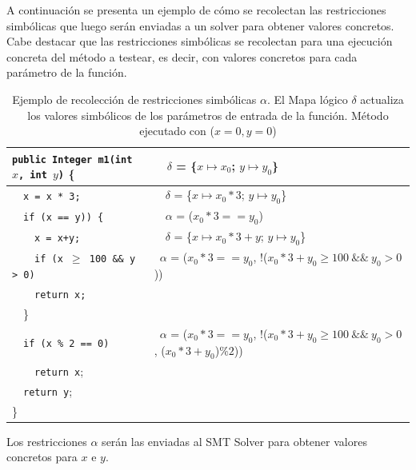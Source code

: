 \documentclass{llncs}
\begin{document}
\begin{itemize}
  A continuación se presenta un ejemplo de cómo se recolectan las restricciones simbólicas que luego serán enviadas a un solver para obtener valores concretos.
  Cabe destacar que las restricciones simbólicas se recolectan para una ejecución concreta del método a testear, es decir, con valores concretos para cada parámetro de la función.
  
      \begin{table}
	\centering
	\begin{tabular}{|m{5.5cm} | m{6cm}|}
	  \hline
	  \texttt{public Integer m1(int $x$, int $y$)} \{  & \ \ $\delta$ = \{$x \mapsto x_0$; $y \mapsto y_0$\}\\
	  \hline
	  \ \ \texttt{x = x * 3;}                          & \ \ $\delta$ = \{$x \mapsto x_0*3$; $y \mapsto y_0$\}\\
	  \hline
	  \ \ \texttt{if (x == y)) \{} 	                   & \ \ $\alpha$ = ($x_0*3 == y_0$)\\
	  \hline
	  \ \ \ \ \texttt{x = x+y;} 		           & \ \ $\delta$ = \{$x \mapsto x_0*3+y$; $y \mapsto y_0$\}\\
	  \hline
	  \ \ \ \ \texttt{if (x $\geq$ 100\ \&\&\ y > 0)}  & \ $\alpha$ = ($x_0*3 == y_0$, !($x_0*3+y_0 \geq 100\ \&\&\ y_0>0$))\\
	  \hline
	  \ \ \ \ \texttt{return x;} 			   & \\
	  \hline
	  \ \ \} 				  	   & \\
	  \hline
	  \ \ \texttt{if (x \% 2 == 0)}			   & \ $\alpha$ = ($x_0*3 == y_0$, !($x_0*3+y_0 \geq 100\ \&\&\ y_0>0$, ($x_0*3+y_0$)$\%2$))\\
	  \hline
	  \ \ \ \ \texttt{return x}; 			   & \\
	  \hline
	  \ \ \texttt{return y}; 		 	   & \\
	  \hline
	  \} 						   & \\
	  \hline
	\end{tabular}
	\caption{Ejemplo de recolección de restricciones simbólicas $\alpha$. El Mapa lógico $\delta$ actualiza los valores simbólicos de los
	parámetros de entrada de la función. Método ejecutado con ($x=0, y=0$)}
      \end{table}
      Los restricciones $\alpha$ serán las enviadas al SMT Solver para obtener valores concretos para $x$ e $y$.
      
\end{itemize}


\end{document}
